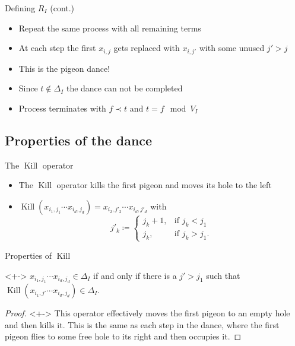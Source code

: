 \documentclass[xcolor={dvipsnames}, aspectratio=169, handout]{beamer}
\renewcommand{\K}{\operatorname{Kill}}
\begin{document}
\begin{frame}{Defining $R_I$ (cont.)}
    \begin{itemize}[<+->]
        \item Repeat the same process with all remaining terms
        \item At each step the first $x_{i, j}$ gets replaced with $x_{i, j'}$ with some unused $j' > j$
        \item This is the pigeon dance!
        \item Since $t \not\in \Delta_I$ the dance can not be completed
        \item Process terminates with $f \prec t$ and $t = f \mod V_I$
    \end{itemize}
\end{frame}

\subsection{Properties of the dance}
\begin{frame}{The $\K$ operator}
    \begin{itemize}[<+->]
        \item The $\K$ operator kills the first pigeon and moves its hole to the left
        \item $\K(x_{i_1, j_1} \cdots x_{i_d, j_d}) = x_{i_2, j'_2} \cdots x_{i_d, j'_d}$ with\\
            $$j'_k \coloneqq \begin{cases}
                    j_k + 1, &\text{if } j_k < j_1\\
                    j_k, &\text{if } j_k > j_1.
                \end{cases}$$
    \end{itemize}
\end{frame}

\begin{frame}{Properties of $\K$}
    \begin{theorem}<+->
        $x_{i_1, j_1} \cdots x_{i_d, j_d} \in \Delta_I$ if and only if there is a $j' > j_1$ such that $\K(x_{i_1, j'} \cdots x_{i_d, j_d}) \in \Delta_I$.
    \end{theorem}
    \begin{proof}[Proof\nopunct]<+->
        This operator effectively moves the first pigeon to an empty hole and then kills it. This is the same as each step in the dance, where the first pigeon flies to some free hole to its right and then occupies it.
    \end{proof}
\end{frame}
\end{document}
